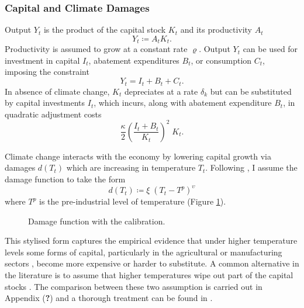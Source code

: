 \documentclass[../../main.tex]{subfiles}
\begin{document}
\subsubsection{Capital and Climate Damages}

Output $Y_t$ is the product of the capital stock $K_t$ and its productivity $A_t$ \begin{equation}
Y_t \coloneqq A_t K_t.
\end{equation} Productivity is assumed to grow at a constant rate $\varrho$. Output $Y_t$ can be used for investment in capital $I_t$, abatement expenditures $B_t$, or consumption $C_t$, imposing the constraint \begin{equation} \label{eq:nominal-budget}
    Y_t = I_t + B_t + C_t.
\end{equation} In absence of climate change, $K_t$ depreciates at a rate $\delta_k$ but can be substituted by capital investments $I_t$, which incurs, along with abatement expenditure $B_t$, in quadratic adjustment costs \begin{equation} \label{eq:adjustment-costs}
    \frac{\kappa}{2} \left( \frac{I_t + B_t}{K_t} \right)^2  \; K_t.
\end{equation}

Climate change interacts with the economy by lowering capital growth via damages $d(T_t)$ which are increasing in temperature $T_t$. Following \cite{weitzman_ghg_2012}, I assume the damage function to take the form \begin{equation}
    d(T_t) \coloneqq \xi \; (T_t - T^p)^{\upsilon}
\end{equation} where $T^p$ is the pre-industrial level of temperature (Figure \ref{fig:damage}). \begin{figure}[H]
    \centering
    
    \caption{Damage function with the \cite{weitzman_ghg_2012} calibration.}
    \label{fig:damage}
\end{figure} \noindent This stylised form captures the empirical evidence that under higher temperature levels some forms of capital, particularly in the agricultural \citep{dietz_growth_2019} or manufacturing sectors \citep{dell_temperature_2009}, become more expensive or harder to substitute. A common alternative in the literature is to assume that higher temperatures wipe out part of the capital stocks \citep{nordhaus_optimal_1992}. The comparison between these two assumption is carried out in Appendix (\textbf{?}) and a thorough treatment can be found in \citep{hambel_optimal_2021}. 
\end{document}
